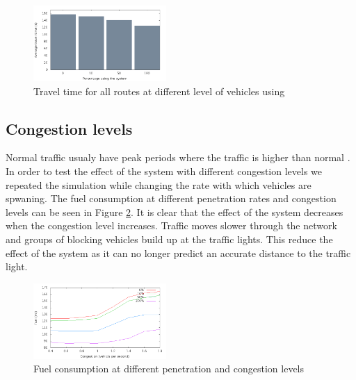 \begin{figure}[htb]
\includegraphics[width=0.45\textwidth]{../images/tp0c1_0/combinedTime.png}
\caption{Travel time for all routes at different level of vehicles using \tech}
\label{fig:TestResults:combinedTime}
\end{figure}

\subsection{Congestion levels}
Normal traffic usualy have peak periods where the traffic is higher than normal \cite{Vejdir}. 
In order to test the effect of the system with different congestion levels we repeated the simulation while changing the rate with which vehicles are spwaning. 
The fuel consumption at different penetration rates and congestion levels can be seen in Figure \ref{fig:TestResults:congestionFuel}. 
It is clear that the effect of the system decreases when the congestion level increases. 
Traffic moves slower through the network and groups of blocking vehicles build up at the traffic lights. 
This reduce the effect of the system as it can no longer predict an accurate distance to the traffic light.
\begin{figure}[htb]
\includegraphics[width=0.45\textwidth]{../images/fuelCongestion.png}
\caption{Fuel consumption at different penetration and congestion levels}
\label{fig:TestResults:congestionFuel}
\end{figure}

